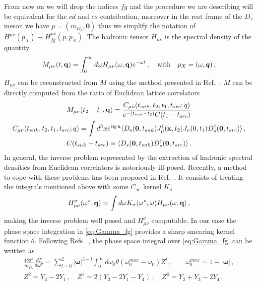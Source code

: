 From now on we will drop the indices $fg$ and the procedure we are describing will be equivalent for the $cd$ and $cs$ contribution,
moreover in the rest frame of the $D_s$ meson we have $p=(m_{D_s},\bm{0})$ thus we simplify the notation of 
$H^{\mu\nu}(p_X)\equiv H^{\mu\nu}_{fg}(p,p_X)$.
The hadronic tensor $H_{\mu\nu}$ is
the spectral density of the quantity  
\begin{equation}
  M_{\mu\nu}(t,{\bf q})= \int_0^{\infty}d \omega H_{\mu\nu} (\omega,{\bf q}) e^{-\omega t}\,,\quad \text{with}\quad p_X=(\omega,\bm{q})\,.
\end{equation}
$H_{\mu\nu}$ can be reconstructed from $M$ using the method presented in
Ref.~\cite{Hansen:2019idp}. $M$ can be directly computed from the
ratio of Euclidean lattice correlators
\begin{gather}
  M_{\mu\nu}(t_2-t_1,{\bf q})=\frac{C_{\mu\nu}(t_{snk},t_2,t_1,t_{src};q)}{e^{-(t_{snk}-t_2)}  C(t_1-t_{src}) }\label{eq:ratio_4pt_2pt}\\
  \label{eq:4pt}
  C_{\mu\nu}(t_{snk},t_2,t_1,t_{src};q)=\int d^3x e^{i{\bf q}\cdot {\bf x}}
  \langle D_s({\bf 0}, t_{snk}) J^{\dagger}_\mu({\bf x},t_2)  J_\nu(0,t_1)
  D_s^\dagger({\bf 0}, t_{src})\rangle\,,\\
  \label{eq:2pt}
  C(t_{snk}-t_{src}) =  \langle D_s({\bf 0}, t_{snk})
  D_s^\dagger({\bf 0}, t_{src})\rangle\,.
\end{gather}
In general, the inverse problem represented by the extraction of
hadronic spectral densities from Euclidean correlators is notoriously
ill-posed. Recently, a method to cope with these problems has been
proposed in Ref.~\cite{Hansen:2019idp}. It consists of treating the
integrals mentioned above with some $C_\infty$ kernel $K_\sigma$  
\begin{equation}
  H^\sigma_{\mu\nu}(\omega^*, {\bf q})= \int d \omega K_\sigma( \omega^*,\omega ) H_{\mu\nu}(\omega, {\bf q})\,,
\end{equation}
making the inverse problem well posed and $H^\sigma_{\mu\nu}$ computable.
In our case the phase space integration in \eqref{eq:Gamma_fg}
provides a sharp smearing kernel function $\theta$. Following
Refs.~\cite{Gambino:2020crt, Gambino:2022dvu}, the phase space integral over
\eqref{eq:Gamma_fg} can be written as 
\begin{gather}
  \frac{48 \pi^4}{m_{D_s}^5}\frac{d\Gamma}{d \bm{ \omega^2} }
  =\sum_{l=0}^2 |\bm{\omega}|^{3-l}\int_0^{\infty}d \omega_0 \theta(\omega_0^{max}-\omega_0) Z^l\,,\quad\quad {\omega}_0^{max}=1-|\bm{\omega}|\,,\\
  Z^2=Y_3-2Y_1\,,\quad Z^1=2(Y_3-2Y_1-Y_4)\,,\quad Z^0=Y_2+Y_3-2Y_4\,.
\end{gather}
